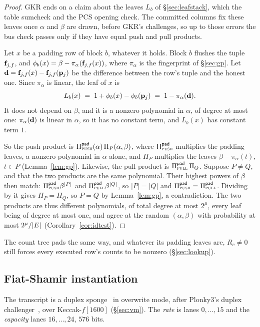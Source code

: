 \begin{proof}
GKR ends on a claim about the leaves $L_b$ of \S\ref{sec:leafstack}, which the table sumcheck and the PCS opening check. The committed columns fix these leaves once $\alpha$ and $\beta$ are drawn, before GKR's challenges, so up to those errors the bus check passes only if they have equal push and pull products.

Let $x$ be a padding row of block $b$, whatever it holds. Block $b$ flushes the tuple $\mathbf{f}_{j,f}$, and $\phi_{b}(x)=\beta-\pi_\alpha(\mathbf{f}_{j,f}(x))$, where $\pi_\alpha$ is the fingerprint of \S\ref{sec:gp}. Let $\mathbf{d}=\mathbf{f}_{j,f}(x)-\mathbf{f}_{j,f}(\mathbf{p}_{j})$ be the difference between the row's tuple and the honest one. Since $\pi_\alpha$ is linear, the leaf of $x$ is
\[
  L_b(x)\;=\;1+\phi_{b}(x)-\phi_{b}(\mathbf{p}_{j})\;=\;1-\pi_\alpha(\mathbf{d}).
\]
It does not depend on $\beta$, and it is a nonzero polynomial in $\alpha$, of degree at most one: $\pi_\alpha(\mathbf{d})$ is linear in $\alpha$, so it has no constant term, and $L_b(x)$ has constant term $1$.

So the push product is $\Pi^{\mathsf{pad}}_{\textsc{push}}(\alpha)\,\Pi_P(\alpha,\beta)$, where $\Pi^{\mathsf{pad}}_{\textsc{push}}$ multiplies the padding leaves, a nonzero polynomial in $\alpha$ alone, and $\Pi_P$ multiplies the leaves $\beta-\pi_\alpha(t)$, $t\in P$ (Lemma~\ref{lem:gp}). Likewise, the pull product is $\Pi^{\mathsf{pad}}_{\textsc{pull}}\,\Pi_Q$. Suppose $P\neq Q$, and that the two products are the same polynomial. Their highest powers of $\beta$ then match: $\Pi^{\mathsf{pad}}_{\textsc{push}}\beta^{|P|}$ and $\Pi^{\mathsf{pad}}_{\textsc{pull}}\beta^{|Q|}$, so $|P|=|Q|$ and $\Pi^{\mathsf{pad}}_{\textsc{push}}=\Pi^{\mathsf{pad}}_{\textsc{pull}}$. Dividing by it gives $\Pi_P=\Pi_Q$, so $P=Q$ by Lemma~\ref{lem:gp}, a contradiction. The two products are thus different polynomials, of total degree at most $2^{\mu}$, every leaf being of degree at most one, and agree at the random $(\alpha,\beta)$ with probability at most $2^{\mu}/|E|$ (Corollary~\ref{cor:idtest}).
\end{proof}

The count tree pads the same way, and whatever its padding leaves are, $R_c\neq0$ still forces every executed row's counts to be nonzero (\S\ref{sec:lookup}).

\subsection{Fiat-Shamir instantiation}\label{sec:e2e-fiat-shamir}

The transcript is a duplex sponge~\cite{BDPV11} in overwrite mode, after Plonky3's duplex challenger~\cite{Plonky3}, over Keccak-$f[1600]$ (\S\ref{sec:vm}). The \emph{rate} is lanes $0,\dots,15$ and the \emph{capacity} lanes $16,\dots,24$, $576$ bits.


